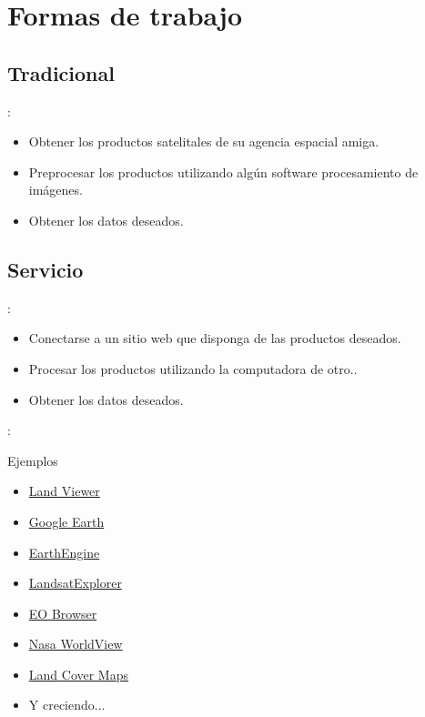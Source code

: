 \documentclass[handout,aspectratio=169]{beamer}
\begin{document}
\section{Formas de trabajo}
\subsection{Tradicional}
\begin{frame}{\secname : \subsecname}
    \begin{itemize}[<+->]
        \item Obtener los productos satelitales de su agencia espacial amiga.
        \item Preprocesar los productos utilizando algún software procesamiento de imágenes.
        \item Obtener los datos deseados.
    \end{itemize}
\end{frame}

\subsection{Servicio}
\begin{frame}{\secname : \subsecname}
    \begin{itemize}[<+->]
        \item Conectarse a un sitio web que disponga de las productos deseados.
        \item Procesar los productos utilizando la computadora de otro..
        \item Obtener los datos deseados.
    \end{itemize}
\end{frame}

\begin{frame}{\secname : \subsecname}
    \begin{exampleblock}{Ejemplos}
        \begin{itemize}
            \item \href{http://lv.eosda.com}{Land Viewer}
            \item \href{https://earth.google.com/web/}{Google Earth}
            \item \href{https://earthengine.google.com}{EarthEngine}
            \item \href{http://landsatexplorer.esri.com/}{LandsatExplorer}
            \item \href{http://apps.sentinel-hub.com/eo-browser/}{EO Browser}
            \item \href{https://worldview.earthdata.nasa.gov/}{Nasa WorldView}
            \item \href{http://maps.elie.ucl.ac.be/CCI/viewer/index.php}{Land Cover Maps}
            \item Y creciendo...
        \end{itemize}
    \end{exampleblock}
\end{frame}
\end{document}
